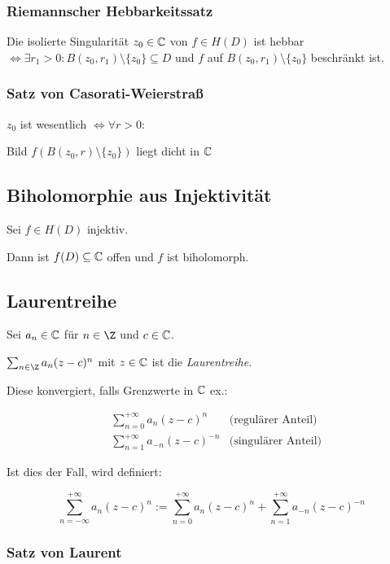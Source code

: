 \subsubsection*{Riemannscher Hebbarkeitssatz}

Die isolierte Singularität $z_0 \in \mathbb{C}$ von $f \in H(D)$ ist hebbar $\iff \exists r_1 > 0 : B(z_0,r_1) \setminus \{z_0\} \subseteq D$ und $f$ auf $B(z_0,r_1) \setminus \{z_0\}$ beschränkt ist.

\subsubsection*{Satz von Casorati-Weierstraß}

$z_0$ ist wesentlich $\iff \forall r > 0 :$

Bild $f(B(z_0,r) \setminus \{z_0\})$ liegt dicht in $\mathbb{C}$

\subsection*{Biholomorphie aus Injektivität}

Sei $f \in H(D)$ injektiv.

Dann ist $f(D) \subseteq \mathbb{C}$ offen und $f$ ist biholomorph.

\columnbreak

\subsection*{Laurentreihe}

Sei $a_n \in \mathbb{C}$ für $n \in \Z$ und $c \in \mathbb{C}$.

$\sum_{n \in \Z} a_n (z-c)^n$ mit $z \in \mathbb{C}$ ist die \emph{Laurentreihe}.

Diese konvergiert, falls Grenzwerte in $\mathbb{C}$ ex.:

\vspace*{-4mm}
\begin{align*}
&\sum_{n=0}^{+\infty} a_n(z-c)^n & \text{(regulärer Anteil)} \\
&\sum_{n=1}^{+\infty} a_{-n}(z-c)^{-n} & \text{(singulärer Anteil)}
\end{align*}

Ist dies der Fall, wird definiert:

\vspace*{-4mm}
$$\sum_{n=-\infty}^{+\infty} a_n(z-c)^n := \sum_{n=0}^{+\infty} a_n(z-c)^n + \sum_{n=1}^{+\infty} a_{-n}(z-c)^{-n}$$

\subsubsection*{Satz von Laurent}

